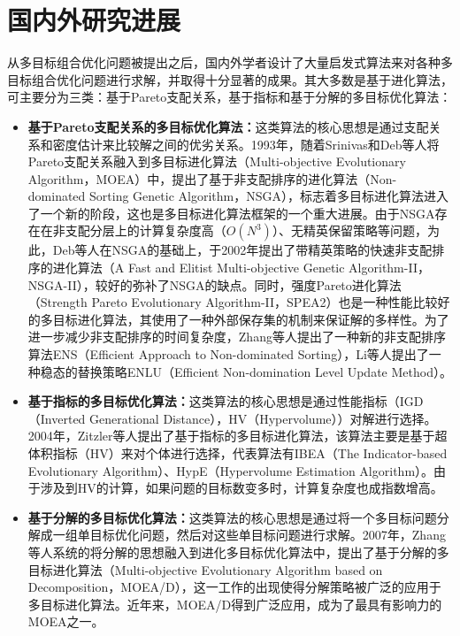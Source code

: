 \section{国内外研究进展}

从多目标组合优化问题被提出之后，国内外学者设计了大量启发式算法来对各种多目标组合优化问题进行求解，并取得十分显著的成果。其大多数是基于进化算法，可主要分为三类：基于Pareto支配关系，基于指标和基于分解的多目标优化算法：
\begin{itemize}
    \item \textbf{基于Pareto支配关系的多目标优化算法：}这类算法的核心思想是通过支配关系和密度估计来比较解之间的优劣关系。1993年，随着Srinivas和Deb等人将Pareto支配关系融入到多目标进化算法（Multi-objective Evolutionary Algorithm，MOEA）中，提出了基于非支配排序的进化算法（Non-dominated Sorting Genetic Algorithm，NSGA）\cite{srinivas1994muiltiobjective}，标志着多目标进化算法进入了一个新的阶段，这也是多目标进化算法框架的一个重大进展。由于NSGA存在在非支配分层上的计算复杂度高（$O(N^3)$）、无精英保留策略等问题，为此，Deb等人在NSGA的基础上，于2002年提出了带精英策略的快速非支配排序的进化算法（A Fast and Elitist Multi-objective Genetic Algorithm-II，NSGA-II）\cite{deb2002fast}，较好的弥补了NSGA的缺点。同时，强度Pareto进化算法（Strength Pareto Evolutionary Algorithm-II，SPEA2）\cite{zitzler2001spea2}也是一种性能比较好的多目标进化算法，其使用了一种外部保存集的机制来保证解的多样性。为了进一步减少非支配排序的时间复杂度，Zhang等人提出了一种新的非支配排序算法ENS（Efficient Approach to Non-dominated Sorting）\cite{zhang2014efficient}，Li等人提出了一种稳态的替换策略ENLU（Efficient Non-domination Level Update Method）\cite{li2016efficient}。
    \item \textbf{基于指标的多目标优化算法：}这类算法的核心思想是通过性能指标（IGD（Inverted Generational Distance）\cite{bosman2003balance}，HV（Hypervolume）\cite{zitzler1999multiobjective}）对解进行选择。2004年，Zitzler等人提出了基于指标的多目标进化算法，该算法主要是基于超体积指标（HV）来对个体进行选择，代表算法有IBEA（The Indicator-based Evolutionary Algorithm）\cite{zitzler2004indicator}、HypE（Hypervolume Estimation Algorithm）\cite{bader2011hype}。由于涉及到HV的计算，如果问题的目标数变多时，计算复杂度也成指数增高。
    \item \textbf{基于分解的多目标优化算法：}这类算法的核心思想是通过将一个多目标问题分解成一组单目标优化问题，然后对这些单目标问题进行求解。2007年，Zhang等人系统的将分解的思想融入到进化多目标优化算法中，提出了基于分解的多目标进化算法（Multi-objective Evolutionary Algorithm based on Decomposition，MOEA/D）\cite{zhang2007moea}，这一工作的出现使得分解策略被广泛的应用于多目标进化算法。近年来，MOEA/D得到广泛应用，成为了最具有影响力的MOEA之一。
\end{itemize}
